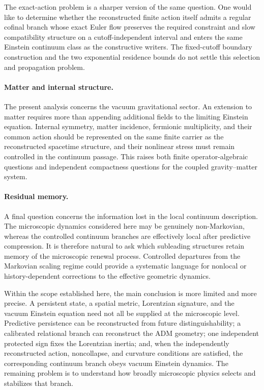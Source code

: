 \documentclass[11pt]{article}
\numberwithin{equation}{section}
\theoremstyle{definition}
\theoremstyle{remark}
\begin{document}
The exact-action problem is a sharper version of the same question.  One
would like to determine whether the reconstructed finite action itself admits
a regular cofinal branch whose exact Euler flow preserves the required
constraint and slow compatibility structure on a cutoff-independent interval
and enters the same Einstein continuum class as the constructive writers.
The fixed-cutoff boundary construction and the two exponential residence
bounds do not settle this selection and propagation problem.

\paragraph{Matter and internal structure.}

The present analysis concerns the vacuum gravitational sector.  An extension
to matter requires more than appending additional fields to the limiting
Einstein equation.  Internal symmetry, matter incidence, fermionic
multiplicity, and their common action should be represented on the same
finite carrier as the reconstructed spacetime structure, and their nonlinear
stress must remain controlled in the continuum passage.  This raises both
finite operator-algebraic questions and independent compactness questions for
the coupled gravity--matter system.

\paragraph{Residual memory.}

A final question concerns the information lost in the local continuum
description.  The microscopic dynamics considered here may be genuinely
non-Markovian, whereas the controlled continuum branches are effectively
local after predictive compression.  It is therefore natural to ask which
subleading structures retain memory of the microscopic renewal process.
Controlled departures from the Markovian scaling regime could provide a
systematic language for nonlocal or history-dependent corrections to the
effective geometric dynamics.

Within the scope established here, the main conclusion is more limited and
more precise.  A persistent state, a spatial metric, Lorentzian signature,
and the vacuum Einstein equation need not all be supplied at the microscopic
level.  Predictive persistence can be reconstructed from future
distinguishability; a calibrated relational branch can reconstruct the ADM
geometry; one independent protected sign fixes the Lorentzian inertia; and,
when the independently reconstructed action, noncollapse, and curvature
conditions are satisfied, the corresponding continuum branch obeys vacuum
Einstein dynamics.  The remaining problem is to understand how broadly
microscopic physics selects and stabilizes that branch.
\end{document}
